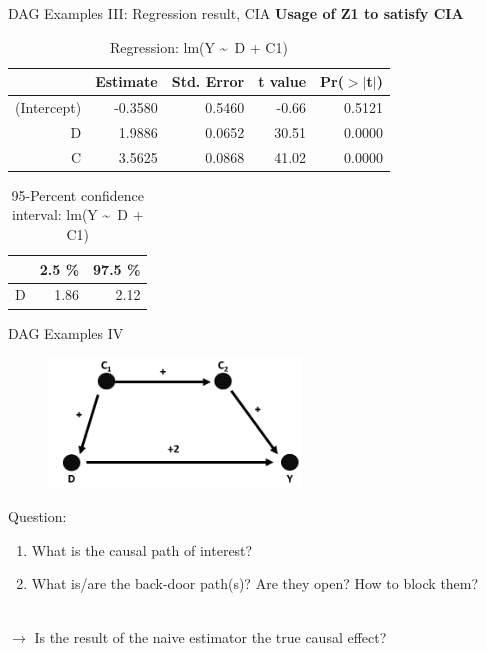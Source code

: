 \documentclass{beamer}\usepackage[]{graphicx}\usepackage[]{xcolor}
\begin{document}
\begin{frame}[fragile]{DAG Examples III: Regression result, CIA}
\textbf{Usage of Z1 to satisfy CIA}
\begin{table}[ht]
\centering
\begingroup\small
\begin{tabular}{rrrrr}
  \hline
 & Estimate & Std. Error & t value & Pr($>$$|$t$|$) \\ 
  \hline
(Intercept) & -0.3580 & 0.5460 & -0.66 & 0.5121 \\ 
  D & 1.9886 & 0.0652 & 30.51 & 0.0000 \\ 
  C & 3.5625 & 0.0868 & 41.02 & 0.0000 \\ 
   \hline
\end{tabular}
\endgroup
\caption{Regression: lm(Y \textasciitilde ~D + C1)} 
\end{table}
\begin{table}[ht]
\centering
\begingroup\small
\begin{tabular}{rrr}
  \hline
 & 2.5 \% & 97.5 \% \\ 
  \hline
D & 1.86 & 2.12 \\ 
   \hline
\end{tabular}
\endgroup
\caption{95-Percent confidence interval: lm(Y \textasciitilde ~D + C1)} 
\end{table}

\end{frame}





\begin{frame}{DAG Examples IV}
\\[1em]
\begin{figure}
\centering
\includegraphics[width=0.6\textwidth]{Graphics/4.LongBack-doorPath-Oversized.png}
\end{figure}
Question:
\begin{enumerate}
\item What is the causal path of interest?
\item What is/are the back-door path(s)? Are they open? How to block them?
\end{enumerate}
\\[1em]
$\rightarrow$ Is the result of the naive estimator the true causal effect?
\end{frame}
\end{document}
